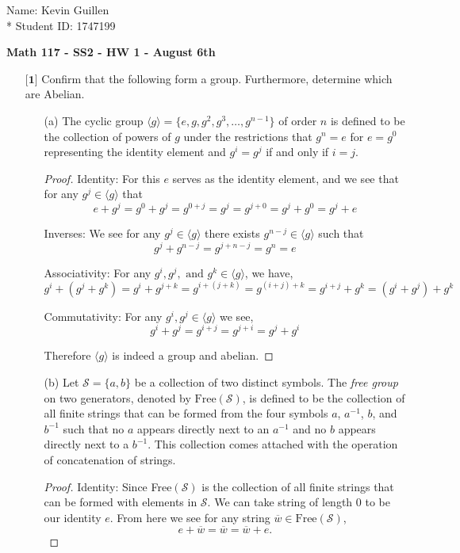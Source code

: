\documentclass[12pt]{article}
\begin{document}
\begin{flushright}
    Name: Kevin Guillen \\*
    Student ID: 1747199
\end{flushright}
\begin{center}
    {\bf Math 117 - SS2 - HW 1 - August 6th}
\end{center}

\begin{itemize}

    \item[$\textbf{[1]}$]
    Confirm that the following form a group. Furthermore, determine which are Abelian. 
    \begin{itemize}
    
    \vspace{.3cm}
    \item[(a)]
    The cyclic group $\langle g \rangle = \{ e,g,g^2,g^3,\dots,g^{n-1} \}$ of order $n$ is defined to be the collection of powers of $g$ under the restrictions that $g^n = e$ for $e = g^0$ representing the identity element and $g^i = g^j$ if and only if $i = j$. 
    \begin{proof}
        Identity: For this $e$ serves as the identity element, and we see that for any $g^j \in \langle g \rangle $ that \[e + g^j = g^0 + g^j = g^{0+j} = g^j = g^{j+0} = g^j + g^0 = g^j + e\]
    
        Inverses: We see for any $g^j \in \langle g \rangle$ there exists $g^{n-j}\in \langle g \rangle $ such that \[g^j + g^{n-j} = g^{j + n - j} = g^n = e\]
    
        Associativity: For any $g^i, g^j, \text{ and }g^k \in \langle g \rangle $, we have,
        \[g^i + (g^j + g^k) = g^i + g^{j + k} = g^{i + (j+k)} = g^{(i+j) +k} = g^{i+j} + g^k = (g^i + g^j) +g^k\]
    
        Commutativity: For any $g^i, g^j \in \langle g \rangle $ we see,
        \[g^i + g^j = g^{i+j} = g^{j+i} = g^j + g^i\]
    
        Therefore $\langle g \rangle $ is indeed a group and abelian. 
    \end{proof}
    
    \vspace{.3cm}
    \item[(b)]
    Let $\mathcal{S} = \{a,b\}$ be a collection of two distinct symbols. The \textit{free group} on two generators, denoted by $\text{Free}(\mathcal{S})$, is defined to be the collection of all finite strings that can be formed from the four symbols $a$, $a^{-1}$, $b$, and $b^{-1}$ such that no $a$ appears directly next to an $a^{-1}$ and no $b$ appears directly next to a $b^{-1}$. This collection comes attached with the operation of concatenation of strings. 
    \begin{proof}
        Identity: Since Free$(\mathcal{S})$ is the collection of all finite strings that can be formed with elements in $\mathcal{S}$. We can take string of length 0 to be our identity $e$. From here we see for any string $\overline{w}\in \text{Free}(\mathcal{S})$, \[e + \overline{w} = \overline{w} = \overline{w} + e.\]
    

\end{proof}
\end{itemize}
\end{itemize}
\end{document}
